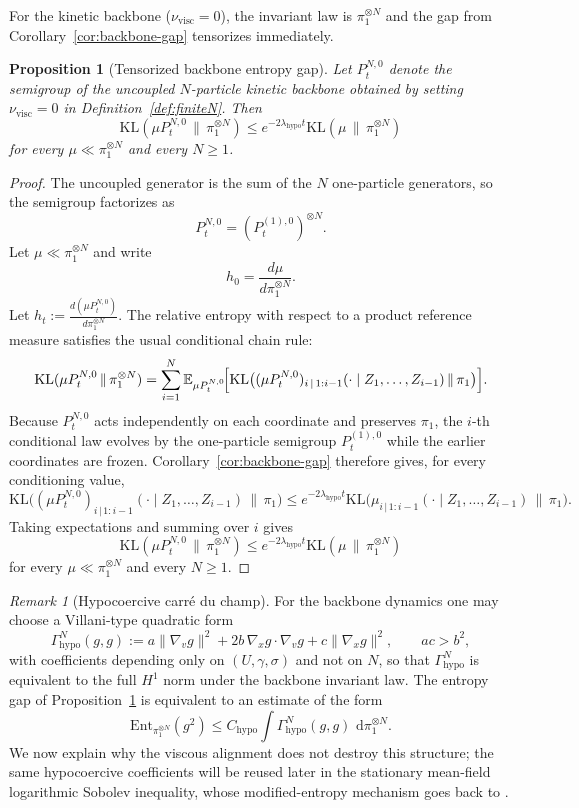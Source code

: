 \documentclass[11pt]{article}
\newtheorem{proposition}[theorem]{Proposition}
\theoremstyle{definition}
\theoremstyle{remark}
\newtheorem{remark}[theorem]{Remark}
\newcommand{\E}{\mathbb{E}}
\newcommand{\KL}{\mathrm{KL}}
\newcommand{\Ent}{\mathrm{Ent}}
\newcommand{\dd}{\,\mathrm{d}}
\begin{document}
For the kinetic backbone ($\nu_{\mathrm{visc}}=0$), the invariant law is
$\pi_1^{\otimes N}$ and the gap from
Corollary~\ref{cor:backbone-gap} tensorizes immediately.

\begin{proposition}[Tensorized backbone entropy gap]\label{prop:tensor}
Let $P_t^{N,0}$ denote the semigroup of the uncoupled $N$-particle kinetic
backbone obtained by setting $\nu_{\mathrm{visc}}=0$ in
Definition~\ref{def:finiteN}. Then
\[
\KL(\mu P_t^{N,0}\,\|\,\pi_1^{\otimes N})
\leq
e^{-2\lambda_{\mathrm{hypo}}t}\KL(\mu\,\|\,\pi_1^{\otimes N})
\]
for every $\mu\ll\pi_1^{\otimes N}$ and every $N\geq1$.
\end{proposition}

\begin{proof}
The uncoupled generator is the sum of the \(N\) one-particle generators, so the
semigroup factorizes as
\[
P_t^{N,0}=(P_t^{(1),0})^{\otimes N}.
\]
Let \(\mu\ll\pi_1^{\otimes N}\) and write
\[
h_0=\frac{d\mu}{d\pi_1^{\otimes N}}.
\]
Let \(h_t:=\frac{d(\mu P_t^{N,0})}{d\pi_1^{\otimes N}}\). The relative entropy
with respect to a product reference measure satisfies the usual conditional
chain rule:
\[
\KL(\mu P_t^{N,0}\,\|\,\pi_1^{\otimes N})
=
\sum_{i=1}^N
\E_{\mu P_t^{N,0}}\!\Bigl[
\KL\bigl((\mu P_t^{N,0})_{i\,|\,1:i-1}(\cdot\mid Z_1,\dots,Z_{i-1})\,\|\,\pi_1\bigr)
\Bigr].
\]
Because \(P_t^{N,0}\) acts independently on each coordinate and preserves
\(\pi_1\), the \(i\)-th conditional law evolves by the one-particle semigroup
\(P_t^{(1),0}\) while the earlier coordinates are frozen. Corollary~\ref{cor:backbone-gap}
therefore gives, for every conditioning value,
\[
\KL\bigl((\mu P_t^{N,0})_{i\,|\,1:i-1}(\cdot\mid Z_1,\dots,Z_{i-1})\,\|\,\pi_1\bigr)
\leq
 e^{-2\lambda_{\mathrm{hypo}}t}
\KL\bigl(\mu_{i\,|\,1:i-1}(\cdot\mid Z_1,\dots,Z_{i-1})\,\|\,\pi_1\bigr).
\]
Taking expectations and summing over \(i\) gives
\[
\KL(\mu P_t^{N,0}\,\|\,\pi_1^{\otimes N})
\leq
 e^{-2\lambda_{\mathrm{hypo}}t}\KL(\mu\,\|\,\pi_1^{\otimes N})
\]
for every $\mu\ll\pi_1^{\otimes N}$ and every $N\geq1$.
\end{proof}

\begin{remark}[Hypocoercive carré du champ]
For the backbone dynamics one may choose a Villani-type quadratic form
\[
\Gamma_{\mathrm{hypo}}^N(g,g)
:=
a\|\nabla_v g\|^2
+2b\,\nabla_x g\cdot\nabla_v g
+c\|\nabla_x g\|^2,
\qquad
ac>b^2,
\]
with coefficients depending only on $(U,\gamma,\sigma)$ and not on $N$, so that
$\Gamma_{\mathrm{hypo}}^N$ is equivalent to the full $H^1$ norm under the
backbone invariant law. The entropy gap of
Proposition~\ref{prop:tensor} is equivalent to an estimate of the form
\[
\Ent_{\pi_1^{\otimes N}}(g^2)
\leq
C_{\mathrm{hypo}}
\int \Gamma_{\mathrm{hypo}}^N(g,g)\,\dd \pi_1^{\otimes N}.
\]
We now explain why the viscous alignment does not destroy this structure; the
same hypocoercive coefficients will be reused later in the stationary
mean-field logarithmic Sobolev inequality, whose modified-entropy mechanism
goes back to \cite{villani2009hypocoercivity}.
\end{remark}
\end{document}
